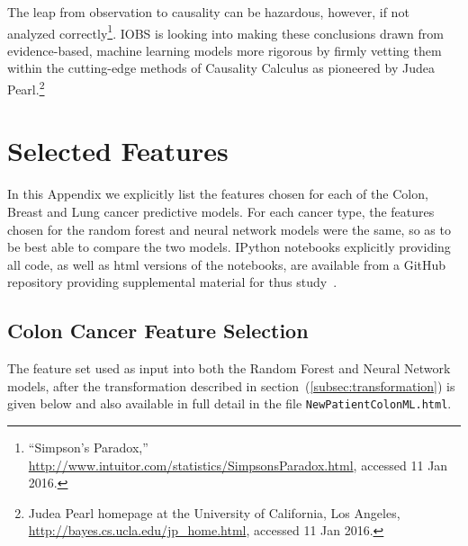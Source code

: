 \documentclass[a4paper,11pt]{article}
\newcommand{\codewhite}[1]{\colorbox{white}{\texttt{#1}}}
\begin{document}
The leap from observation to causality can be hazardous, however, if not analyzed correctly\footnote{``Simpson's Paradox,'' \url{http://www.intuitor.com/statistics/SimpsonsParadox.html}, accessed 11 Jan 2016.}.
 IOBS is looking into making these conclusions drawn from evidence-based, machine learning models more rigorous by firmly vetting them within the cutting-edge methods of Causality Calculus as pioneered by Judea Pearl.\footnote{Judea Pearl homepage at the University of California, Los Angeles, \url{http://bayes.cs.ucla.edu/jp_home.html}, accessed 11 Jan 2016.}

\appendix
\section{Selected Features}
\label{sec:features}
In this Appendix we explicitly list the features chosen for each of the Colon, Breast and Lung cancer predictive models. For each cancer type, the features chosen for the random forest and neural network models were the same, so as to be best able to compare the two models.
IPython notebooks explicitly providing all code, as well as html versions of the notebooks, are available from a GitHub repository providing supplemental material for thus study~\cite{supp}.



\subsection{Colon Cancer Feature Selection}
\label{subsec:colonfeatures}

The feature set used as input into both the Random Forest and Neural Network models, after the transformation described in section~(\ref{subsec:transformation}) is given below and also available in full detail in the file 
\codewhite{NewPatientColonML.html}.
\end{document}

